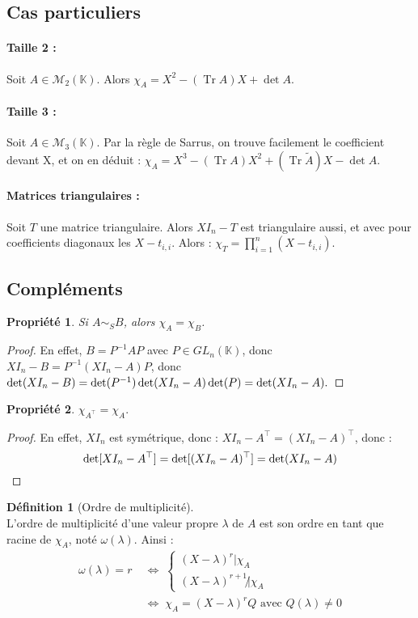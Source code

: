 \documentclass[12pt]{book}
\let\ensembleNombre\mathbb
\newcommand*\K{\ensuremath{\ensembleNombre{K}}}
\DeclareMathOperator{\Tr}{Tr}
\newtheorem*{prop}{Propriété}
\theoremstyle{definition}
\newtheorem*{defi}{Définition}
\theoremstyle{remark}
\newenvironment{fdef}
  {\begin{mdframed}[roundcorner=10pt, linewidth=1pt]\begin{defi}}
  {\end{defi}\end{mdframed}}
\begin{document}
	\subsection{Cas particuliers}
	\paragraph{Taille 2 : } Soit $A \in \mathcal M_2(\K)$. Alors $\boxed{\chi_A = X^2 - (\Tr A)X + \det A.}$
	
	\paragraph{Taille 3 : } Soit $A \in \mathcal M_3(\K)$. Par la règle de Sarrus, on trouve facilement le coefficient devant X, et on en déduit : $ \boxed{ \chi_A = X^3 - (\Tr A)X^2 + (\Tr \widetilde A)X - \det A.} $
	
	\paragraph{Matrices triangulaires : } Soit $T$ une matrice triangulaire. Alors $XI_n - T$ est triangulaire aussi, et avec pour coefficients diagonaux les $X - t_{i,i}$. Alors : $ \boxed{ \chi_T = \prod_{i=1}^n \left( X - t_{i,i} \right) .}$
	
	\subsection{Compléments}
	\begin{prop}
	Si $A \sim_S B$, alors $\chi_A = \chi_B$.
	\end{prop}
	\begin{proof}
	En effet, $ B = P^{-1}AP$ avec $P \in GL_n(\K)$, donc $XI_n - B = P^{-1} (XI_n - A)P$, donc $\det(XI_n - B) = \det (P^{-1}) \det (XI_n - A) \det (P) = \det (XI_n - A).\qedhere$
	\end{proof}
	
	\begin{prop}
	$\chi_{A^\top} = \chi_A.$
	\end{prop}
	\begin{proof}
	En effet, $XI_n$ est symétrique, donc : $XI_n - A^\top = (XI_n - A)^\top$, donc :
	\[\det [XI_n - A^\top] = \det [ (XI_n - A)^\top] = \det (XI_n - A)\qedhere\] 
	\end{proof}
	
	\begin{fdef}[Ordre de multiplicité] \mbox{~}\\
	L'ordre de multiplicité d'une valeur propre $\lambda$ de $A$ est son ordre en tant que racine de $\chi_A$, noté $\omega(\lambda)$. Ainsi :
	\begin{align*}
	\omega(\lambda) = r \; &\Longleftrightarrow \;	\begin{cases} 
													(X - \lambda)^r | \chi_A \\
													(X - \lambda)^{r+1} \not | \chi_A
													\end{cases} \\
	&\Longleftrightarrow \; \chi_A = (X - \lambda)^rQ \text{ avec } Q(\lambda) \neq 0
	\end{align*}
	\end{fdef}
	
\end{document}
